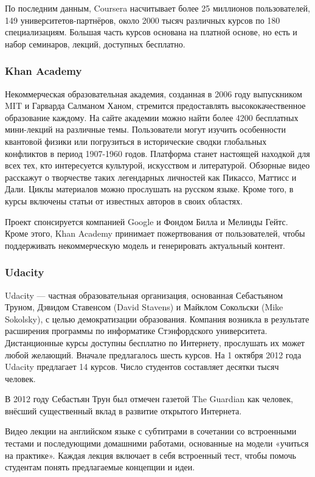 По последним данным, Coursera насчитывает более 25 миллионов пользователей,
149 университетов-партнёров, около 2000 тысяч различных курсов по 180 специализациям.
Большая часть курсов основана на платной основе, но есть и набор семинаров, лекций, доступных
бесплатно.

\subsubsection{Khan Academy}

Некоммерческая образовательная академия, созданная в 2006 году выпускником MIT и Гарварда
Салманом Ханом, стремится предоставлять высококачественное образование каждому. На сайте
академии можно найти более 4200 бесплатных мини-лекций на различные темы. Пользователи
могут изучить особенности квантовой физики или погрузиться в исторические сводки глобальных
конфликтов в период 1907-1960 годов. Платформа станет настоящей находкой для всех тех,
кто интересуется культурой, искусством и литературой. Обзорные видео расскажут о творчестве
таких легендарных личностей как Пикассо, Маттисс и Дали. Циклы материалов можно прослушать
на русском языке. Кроме того, в курсы включены статьи от известных авторов в своих областях.

Проект спонсируется компанией Google и Фондом Билла и Мелинды Гейтс. Кроме этого,
Khan Academy принимает пожертвования от пользователей, чтобы поддерживать некоммерческую
модель и генерировать актуальный контент.

\subsubsection{Udacity}

Udacity — частная образовательная организация, основанная Себастьяном Труном,
Дэвидом Ставенсом (David Stavens) и Майклом Сокольски (Mike Sokolsky),
с целью демократизации образования. Компания возникла в результате расширения
программы по информатике Стэнфордского университета.
Дистанционные курсы доступны бесплатно по Интернету, прослушать их может любой желающий.
Вначале предлагалось шесть курсов. На 1 октября 2012 года Udacity предлагает 14 курсов.
Число студентов составляет десятки тысяч человек.\cite{udacity}

В 2012 году Себастьян Трун был отмечен газетой The Guardian как человек, внёсший
существенный вклад в развитие открытого Интернета.

Видео лекции на английском языке с субтитрами в сочетании со встроенными тестами
и последующими домашними работами, основанные на модели «учиться на практике».
Каждая лекция включает в себя встроенный тест, чтобы помочь студентам понять предлагаемые
концепции и идеи.

